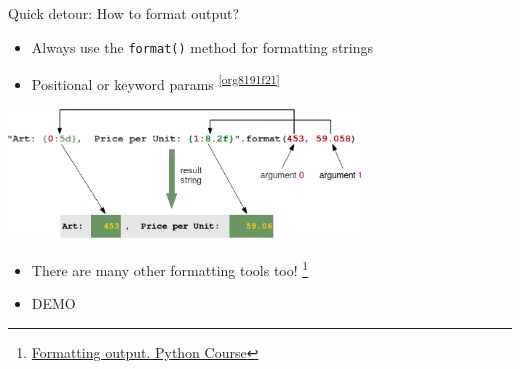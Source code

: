 \documentclass[presentation]{beamer}
\begin{document}
\begin{frame}[label={sec:org37739c2},fragile]{Quick detour: How to format output?}
 \begin{itemize}
\item Always use the \texttt{format()} method for formatting strings
\item Positional or keyword params \textsuperscript{\ref{org8191f21}}
\end{itemize}
\begin{center}
\includegraphics[width=0.7\textwidth]{images/format_method_positional_parameters.png}
\end{center}
\begin{itemize}
\item There are many other formatting tools too! \footnote{\href{https://www.python-course.eu/python3\_formatted\_output.php}{Formatting output. Python Course}}
\item \alert{DEMO}
\end{itemize}
\end{frame}
\end{document}
